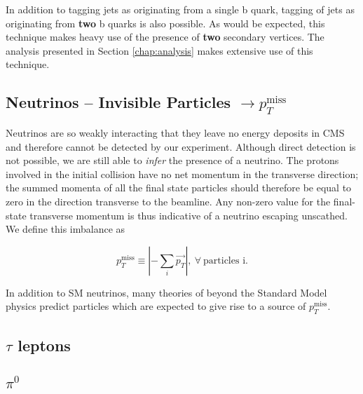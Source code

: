 In addition to tagging jets as originating from a single b quark, tagging of jets as originating from \textbf{two} b quarks is also possible.\cite{bbtagger} As would be expected, this technique makes heavy use of the presence of \textbf{two} secondary vertices. The analysis presented in Section \ref{chap:analysis} makes extensive use of this technique.

\subsection{Neutrinos -- Invisible Particles $\rightarrow p_{T}^{\mathrm{miss}}$}

Neutrinos are so weakly interacting that they leave no energy deposits in CMS and therefore cannot be detected by our experiment. Although direct detection is not possible, we are still able to \textit{infer} the presence of a neutrino. The protons involved in the initial collision have no net momentum in the transverse direction; the summed momenta of all the final state particles should therefore be equal to zero in the direction transverse to the beamline. Any non-zero value for the final-state transverse momentum is thus indicative of a neutrino escaping unscathed. We define this imbalance as 

\begin{equation}
p_{T}^{\mathrm{miss}}  \equiv \left | - \sum_{i} \vec{p_{T}} \right |,~\forall~\textrm{particles~i}.
\end{equation}

In addition to SM neutrinos, many theories of beyond the Standard Model physics predict particles which are expected to give rise to a source of $p_{T}^{\mathrm{miss}}$.

\subsection{$\tau$ leptons}
\subsection{$\pi^{0}$}



